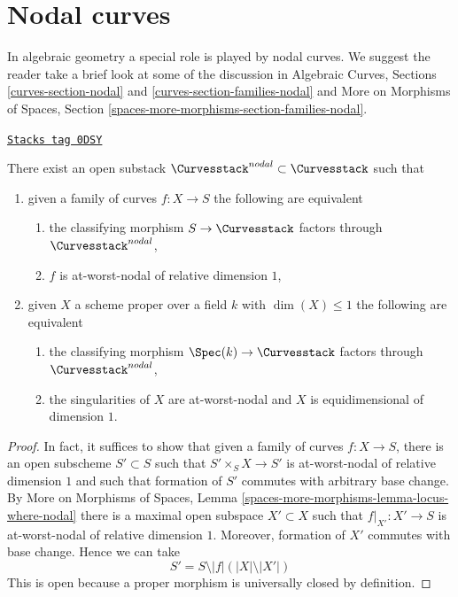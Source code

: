 \section{Nodal curves}
\label{moduli-curves-section-nodal-curves}
In algebraic geometry a special role is played by nodal curves.
We suggest the reader take a brief look at some of the discussion
in Algebraic Curves, Sections \ref{curves-section-nodal} and
\ref{curves-section-families-nodal}
and More on Morphisms of Spaces, Section
\ref{spaces-more-morphisms-section-families-nodal}.

\begin{lemma}
\label{moduli-curves-lemma-nodal-curves}
\href{https://stacks.math.columbia.edu/tag/0DSY}{\texttt{Stacks tag 0DSY}}

There exist an open substack $\Curvesstack^{nodal} \subset \Curvesstack$
such that
\begin{enumerate}
\item given a family of curves $f : X \to S$ the following are equivalent
\begin{enumerate}
\item the classifying morphism $S \to \Curvesstack$ factors
through $\Curvesstack^{nodal}$,
\item $f$ is at-worst-nodal of relative dimension $1$,
\end{enumerate}
\item given $X$ a scheme proper over a field $k$ with
$\dim(X) \leq 1$ the following are equivalent
\begin{enumerate}
\item the classifying morphism $\Spec(k) \to \Curvesstack$ factors
through $\Curvesstack^{nodal}$,
\item the singularities of $X$ are at-worst-nodal and $X$
is equidimensional of dimension $1$.
\end{enumerate}
\end{enumerate}
\end{lemma}

\begin{proof}
In fact, it suffices to show that given a family of curves
$f : X \to S$, there is an open subscheme $S' \subset S$
such that $S' \times_S X \to S'$ is at-worst-nodal of relative dimension $1$
and such that formation of $S'$ commutes with arbitrary base change.
By More on Morphisms of Spaces, Lemma
\ref{spaces-more-morphisms-lemma-locus-where-nodal}
there is a maximal open subspace $X' \subset X$ such
that $f|_{X'} : X' \to S$ is at-worst-nodal of relative dimension $1$.
Moreover, formation of $X'$ commutes with base change.
Hence we can take
$$
S' = S \setminus |f|(|X| \setminus |X'|)
$$
This is open because a proper morphism is universally closed by
definition.
\end{proof}


